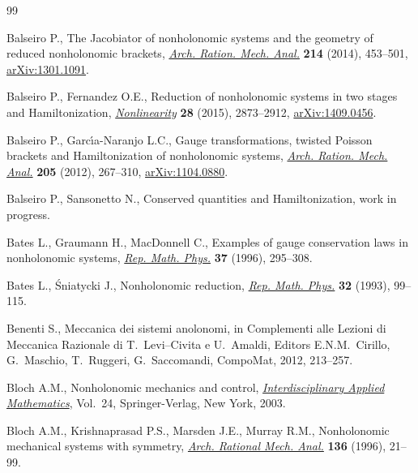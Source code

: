 \documentclass[10pt,a4paper]{amsart}
\numberwithin{equation}{section}
\begin{document}
\begin{thebibliography}{99}
\footnotesize\itemsep=0pt

Balseiro P., The {J}acobiator of nonholonomic systems and the geometry of
  reduced nonholonomic brackets, \href{http://dx.doi.org/10.1007/s00205-014-0759-4}{\textit{Arch. Ration. Mech. Anal.}}
  \textbf{214} (2014), 453--501, \href{http://arxiv.org/abs/1301.1091}{arXiv:1301.1091}.

Balseiro P., Fernandez O.E., Reduction of nonholonomic systems in two stages
  and {H}amiltonization, \href{http://dx.doi.org/10.1088/0951-7715/28/8/2873}{\textit{Nonlinearity}} \textbf{28} (2015), 2873--2912,
  \href{http://arxiv.org/abs/1409.0456}{arXiv:1409.0456}.

Balseiro P., Garc{\'{\i}}a-Naranjo L.C., Gauge transformations, twisted
  {P}oisson brackets and {H}amiltonization of nonholonomic systems,
  \href{http://dx.doi.org/10.1007/s00205-012-0512-9}{\textit{Arch. Ration. Mech. Anal.}} \textbf{205} (2012), 267--310,
  \href{http://arxiv.org/abs/1104.0880}{arXiv:1104.0880}.

Balseiro P., Sansonetto N., Conserved quantities and {H}amiltonization, {w}ork in progress.

Bates L., Graumann H., MacDonnell C., Examples of gauge conservation laws in
  nonholonomic systems, \href{http://dx.doi.org/10.1016/0034-4877(96)84069-9}{\textit{Rep. Math. Phys.}} \textbf{37} (1996), 295--308.

Bates L., {\'S}niatycki J., Nonholonomic reduction, \href{http://dx.doi.org/10.1016/0034-4877(93)90073-N}{\textit{Rep. Math. Phys.}}
  \textbf{32} (1993), 99--115.

Benenti S., Meccanica dei sistemi anolonomi, in Complementi alle Lezioni di
  Meccanica Razionale di T.~Levi--Civita e U.~Amaldi, Editors E.N.M.~Cirillo,
  G.~Maschio, T.~Ruggeri, G.~Saccomandi, CompoMat, 2012, 213--257.

Bloch A.M., Nonholonomic mechanics and control, \href{http://dx.doi.org/10.1007/b97376}{\textit{Interdisciplinary
  Applied Mathematics}}, Vol.~24, Springer-Verlag, New York, 2003.

Bloch A.M., Krishnaprasad P.S., Marsden J.E., Murray R.M., Nonholonomic
  mechanical systems with symmetry, \href{http://dx.doi.org/10.1007/BF02199365}{\textit{Arch. Rational Mech. Anal.}}
  \textbf{136} (1996), 21--99.


\end{thebibliography}
\end{document}
